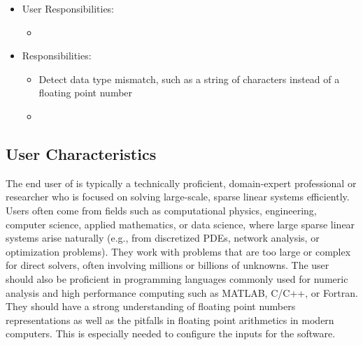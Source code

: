 \documentclass[12pt]{article}
\begin{document}
\begin{itemize}
\item User Responsibilities:
\begin{itemize}
\item
\end{itemize}
\item \progname{} Responsibilities:
\begin{itemize}
\item Detect data type mismatch, such as a string of characters instead of a
  floating point number
\item
\end{itemize}
\end{itemize}

 

\subsection{User Characteristics} \label{SecUserCharacteristics}

The end user of \progname{} is typically a technically proficient, domain-expert
professional or researcher who is focused on solving large-scale, sparse linear
systems efficiently. Users often come from fields such as computational physics,
engineering, computer science, applied mathematics, or data science, where large
sparse linear systems arise naturally (e.g., from discretized PDEs, network
analysis, or optimization problems). They work with problems that are too large
or complex for direct solvers, often involving millions or billions of unknowns.
The user should also be proficient in programming languages commonly used for
numeric analysis and high performance computing such as MATLAB, C/C++, or
Fortran. They should have a strong understanding of floating point numbers
representations as well as the pitfalls in floating point arithmetics in modern
computers. This is especially needed to configure the inputs for the software.
\end{document}
